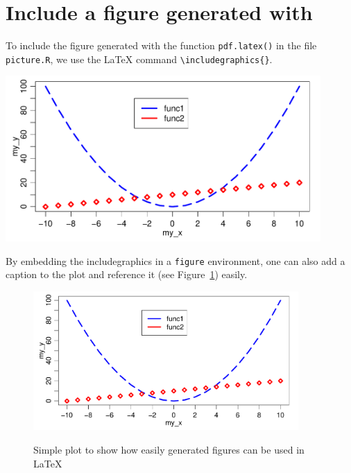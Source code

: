 \documentclass[11pt,a4paper]{article}
\begin{document}
\section{Include a figure generated with \Rp}
To include the figure generated with the \Rp function \texttt{pdf.latex()}
in the file \texttt{picture.R}, we use the \LaTeX{} command
\texttt{\textbackslash includegraphics\{\}}.

\begin{center}
  \includegraphics[width=0.9\textwidth]{template-files/test_plot}
\end{center}

By embedding the includegraphics in a \texttt{figure} environment, one can
also add a caption to the plot and reference it (see
Figure~\ref{fig:testfig}) easily.

\begin{figure}[!h]
  \centering
  \includegraphics[width=0.9\textwidth]{template-files/test_plot}
  \label{fig:testfig}
  \caption{Simple plot to show how easily \Rp generated figures can be used
    in \LaTeX{}}
\end{figure}
\end{document}
